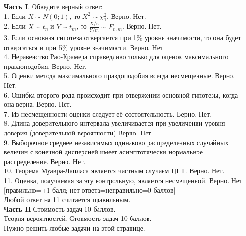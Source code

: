 \documentclass[pdftex,12pt,a4paper]{article}
\begin{document}
\textbf{Часть I}. Обведите верный ответ: \\

1. Если $X\sim N(0;1)$, то $X^{2}\sim \chi^{2}_{1}$. Верно. Нет. \\

2. Если $X\sim t_{n}$ и $Y\sim t_{m}$, то $\frac{X/n}{Y/m}\sim F_{n,m}$. Верно. Нет. \\

3.	Если основная гипотеза отвергается  при 1\% уровне значимости, то она будет отвергаться и при 5\% уровне значимости. Верно. Нет. \\

4.	Неравенство Рао-Крамера справедливо только для оценок максимального правдоподобия. Верно. Нет. \\

5.	Оценки метода максимального правдоподобия всегда несмещенные. Верно. Нет. \\

6.	Ошибка второго рода происходит при отвержении основной гипотезы, когда она верна. Верно. Нет. \\

7.	Из несмещенности оценки следует её состоятельность. Верно. Нет. \\

8.	Длина доверительного интервала увеличивается при увеличении уровня доверия (доверительной вероятности) Верно. Нет. \\

9.	Выборочное среднее независимых одинаково распределенных случайных величин с конечной дисперсией имеет асимптотически нормальное распределение. Верно. Нет. \\

10.	Теорема Муавра-Лапласа  является частным случаем ЦПТ. Верно. Нет. \\

11.	 Оценка, получаемая за эту контрольную, является несмещенной. Верно. Нет\\


$[$правильно=+1 балл; нет ответа=неправильно=0 баллов$]$ \\
Любой ответ на 11 считается правильным. \\




\pagebreak \textbf{Часть II} Стоимость задач 10 баллов. \\

Теория вероятностей. Стоимость задач 10 баллов. \\
Нужно решить любые \textbf{} задачи на этой странице. \\
\end{document}
